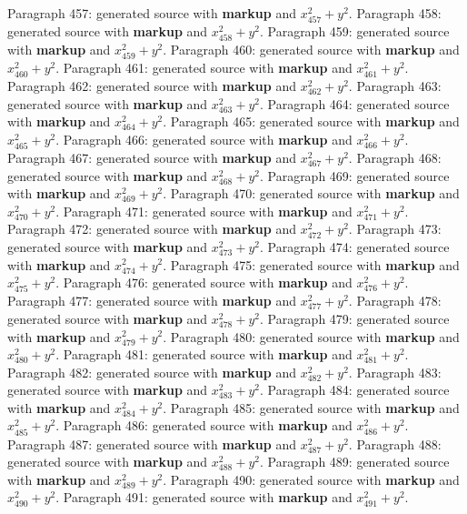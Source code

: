 \documentclass{article}
\begin{document}
Paragraph 457: generated source with \textbf{markup} and $x_{457}^2 + y^2$.
Paragraph 458: generated source with \textbf{markup} and $x_{458}^2 + y^2$.
Paragraph 459: generated source with \textbf{markup} and $x_{459}^2 + y^2$.
Paragraph 460: generated source with \textbf{markup} and $x_{460}^2 + y^2$.
Paragraph 461: generated source with \textbf{markup} and $x_{461}^2 + y^2$.
Paragraph 462: generated source with \textbf{markup} and $x_{462}^2 + y^2$.
Paragraph 463: generated source with \textbf{markup} and $x_{463}^2 + y^2$.
Paragraph 464: generated source with \textbf{markup} and $x_{464}^2 + y^2$.
Paragraph 465: generated source with \textbf{markup} and $x_{465}^2 + y^2$.
Paragraph 466: generated source with \textbf{markup} and $x_{466}^2 + y^2$.
Paragraph 467: generated source with \textbf{markup} and $x_{467}^2 + y^2$.
Paragraph 468: generated source with \textbf{markup} and $x_{468}^2 + y^2$.
Paragraph 469: generated source with \textbf{markup} and $x_{469}^2 + y^2$.
Paragraph 470: generated source with \textbf{markup} and $x_{470}^2 + y^2$.
Paragraph 471: generated source with \textbf{markup} and $x_{471}^2 + y^2$.
Paragraph 472: generated source with \textbf{markup} and $x_{472}^2 + y^2$.
Paragraph 473: generated source with \textbf{markup} and $x_{473}^2 + y^2$.
Paragraph 474: generated source with \textbf{markup} and $x_{474}^2 + y^2$.
Paragraph 475: generated source with \textbf{markup} and $x_{475}^2 + y^2$.
Paragraph 476: generated source with \textbf{markup} and $x_{476}^2 + y^2$.
Paragraph 477: generated source with \textbf{markup} and $x_{477}^2 + y^2$.
Paragraph 478: generated source with \textbf{markup} and $x_{478}^2 + y^2$.
Paragraph 479: generated source with \textbf{markup} and $x_{479}^2 + y^2$.
Paragraph 480: generated source with \textbf{markup} and $x_{480}^2 + y^2$.
Paragraph 481: generated source with \textbf{markup} and $x_{481}^2 + y^2$.
Paragraph 482: generated source with \textbf{markup} and $x_{482}^2 + y^2$.
Paragraph 483: generated source with \textbf{markup} and $x_{483}^2 + y^2$.
Paragraph 484: generated source with \textbf{markup} and $x_{484}^2 + y^2$.
Paragraph 485: generated source with \textbf{markup} and $x_{485}^2 + y^2$.
Paragraph 486: generated source with \textbf{markup} and $x_{486}^2 + y^2$.
Paragraph 487: generated source with \textbf{markup} and $x_{487}^2 + y^2$.
Paragraph 488: generated source with \textbf{markup} and $x_{488}^2 + y^2$.
Paragraph 489: generated source with \textbf{markup} and $x_{489}^2 + y^2$.
Paragraph 490: generated source with \textbf{markup} and $x_{490}^2 + y^2$.
Paragraph 491: generated source with \textbf{markup} and $x_{491}^2 + y^2$.
\end{document}
